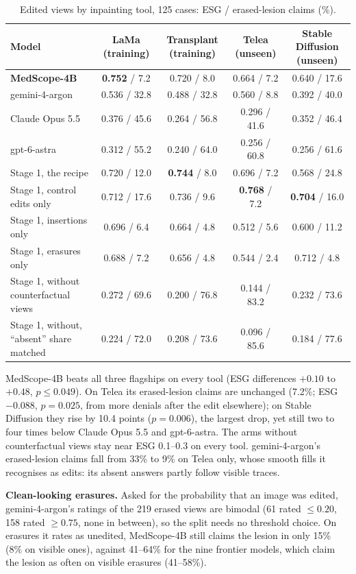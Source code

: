 \documentclass[11pt]{article}
\newcommand{\best}[1]{\textbf{#1}}
\begin{document}
\begin{table}[t]
\centering\footnotesize\setlength{\tabcolsep}{4pt}
\caption{Edited views by inpainting tool, 125 cases: ESG / erased-lesion claims (\%).}
\label{tab:inpaint}
\begin{tabular}{lcccc}
\toprule
Model & LaMa (training) & Transplant (training) & Telea (unseen) & Stable Diffusion (unseen) \\
\midrule
\textbf{MedScope-4B} & \best{0.752} / 7.2 & 0.720 / 8.0 & 0.664 / 7.2 & 0.640 / 17.6 \\
gemini-4-argon & 0.536 / 32.8 & 0.488 / 32.8 & 0.560 / 8.8 & 0.392 / 40.0 \\
Claude Opus 5.5 & 0.376 / 45.6 & 0.264 / 56.8 & 0.296 / 41.6 & 0.352 / 46.4 \\
gpt-6-astra & 0.312 / 55.2 & 0.240 / 64.0 & 0.256 / 60.8 & 0.256 / 61.6 \\
\midrule
Stage 1, the recipe & 0.720 / 12.0 & \best{0.744} / 8.0 & 0.696 / 7.2 & 0.568 / 24.8 \\
Stage 1, control edits only & 0.712 / 17.6 & 0.736 / 9.6 & \best{0.768} / 7.2 & \best{0.704} / 16.0 \\
Stage 1, insertions only & 0.696 / 6.4 & 0.664 / 4.8 & 0.512 / 5.6 & 0.600 / 11.2 \\
Stage 1, erasures only & 0.688 / 7.2 & 0.656 / 4.8 & 0.544 / 2.4 & 0.712 / 4.8 \\
Stage 1, without counterfactual views & 0.272 / 69.6 & 0.200 / 76.8 & 0.144 / 83.2 & 0.232 / 73.6 \\
Stage 1, without, ``absent'' share matched & 0.224 / 72.0 & 0.208 / 73.6 & 0.096 / 85.6 & 0.184 / 77.6 \\
\bottomrule
\end{tabular}
\end{table}

MedScope-4B beats all three flagships on every tool (ESG differences $+0.10$ to $+0.48$, $p\le0.049$). On Telea its erased-lesion claims are unchanged (7.2\%; ESG $-0.088$, $p=0.025$, from more denials after the edit elsewhere); on Stable Diffusion they rise by 10.4 points ($p=0.006$), the largest drop, yet still two to four times below Claude Opus 5.5 and gpt-6-astra. The arms without counterfactual views stay near ESG 0.1--0.3 on every tool. gemini-4-argon's erased-lesion claims fall from 33\% to 9\% on Telea only, whose smooth fills it recognises as edits: its absent answers partly follow visible traces.

\textbf{Clean-looking erasures.} Asked for the probability that an image was edited, gemini-4-argon's ratings of the 219 erased views are bimodal (61 rated $\le0.20$, 158 rated $\ge0.75$, none in between), so the split needs no threshold choice. On erasures it rates as unedited, MedScope-4B still claims the lesion in only 15\% (8\% on visible ones), against 41--64\% for the nine frontier models, which claim the lesion as often on visible erasures (41--58\%).
\end{document}
